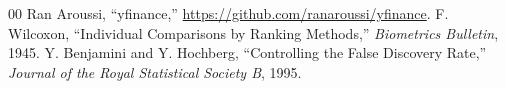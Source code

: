 \documentclass[conference]{IEEEtran}
\begin{document}
\begin{thebibliography}{00}
 Ran Aroussi, ``yfinance,'' \url{https://github.com/ranaroussi/yfinance}.
 F. Wilcoxon, ``Individual Comparisons by Ranking Methods,'' \textit{Biometrics Bulletin}, 1945.
 Y. Benjamini and Y. Hochberg, ``Controlling the False Discovery Rate,'' \textit{Journal of the Royal Statistical Society B}, 1995.
\end{thebibliography}
\end{document}
